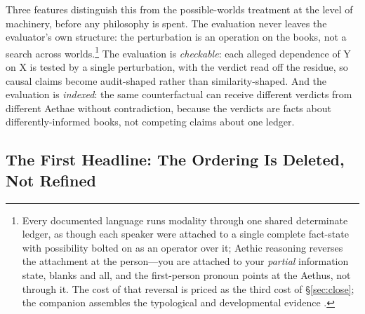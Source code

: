\documentclass[11pt]{article}
\theoremstyle{definition}
\newcommand{\Aethus}{Aethus}
\begin{document}
Three features distinguish this from the possible-worlds treatment at the level of machinery, before any philosophy is spent. The evaluation never leaves the evaluator's own structure: the perturbation is an operation on the books, not a search across worlds.\footnote{Every documented language runs modality through one shared determinate ledger, as though each speaker were attached to a single complete fact-state with possibility bolted on as an operator over it; Aethic reasoning reverses the attachment at the person---you are attached to your \emph{partial} information state, blanks and all, and the first-person pronoun points at the \Aethus{}, not through it. The cost of that reversal is priced as the third cost of \S\ref{sec:close}; the companion assembles the typological and developmental evidence \cite{Aethus}.} The evaluation is \emph{checkable}: each alleged dependence of Y on X is tested by a single perturbation, with the verdict read off the residue, so causal claims become audit-shaped rather than similarity-shaped. And the evaluation is \emph{indexed}: the same counterfactual can receive different verdicts from different Aethae without contradiction, because the verdicts are facts about differently-informed books, not competing claims about one ledger.

\subsection{The First Headline: The Ordering Is Deleted, Not Refined}\label{sec:deletion}
\end{document}
